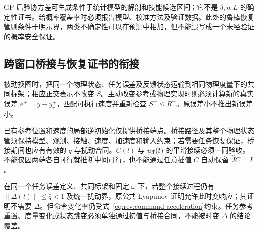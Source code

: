 \documentclass[11pt,a4paper]{article}
\numberwithin{equation}{section}
\theoremstyle{definition}
\begin{document}
GP 后验协方差可生成条件于统计模型的解剖和技能候选区间；它不是 $\delta,\eta,L$ 的确定性证书。给概率覆盖率时必须报告模型、校准方法及验证数据。此处的鲁棒恢复管则条件于明示界，两类不确定性可以在预测中相加，但不能混写成一个未经验证的概率安全保证。


\subsection{跨窗口桥接与恢复证书的衔接}
\label{sec:rev:window-bridge}
被动换图时，把同一个物理状态、任务误差及反馈状态运输到相同物理度量下的共同标架；相应正交表示不改变 $S$。主动改变参考或物理实现时则必须计算新的真实误差 $e^+=y-y_r^+$，匹配可执行速度并重新检查 $S^+\le R^+$。原误差小不推出新误差小。

已有参考位置和速度的局部逆初始化仅提供桥接端点。桥接路径及其整个物理状态管须保持模型、观测、接触、速度、加速度和输入约束；若需要任务恢复保证，桥接期间也应有有效的 $q$ 与扰动合同。$C(t)$ 与 $u_{\rm ff}(t)$ 的平滑接续必须一同验收。不能仅因两端各自可行就推断中间可行，也不能通过任意插值 $C$ 自动保留 $\widehat JC=I$。

在同一个任务误差定义、共同标架和固定 $\omega$ 下，若整个接续过程仍有 $\|\Delta(t)\|\le\bar q<1$ 及统一扰动界，原公共 Lyapunov 证明允许此时变响应；其证明不需要 $\dot\Delta$。但命令变化率仍受式~\eqref{eq:rev:command-acceleration}约束。任务参考重置、度量变化或状态跳变必须单独通过初值与桥接合同，不能被时变 $\Delta$ 的结论覆盖。
\end{document}
